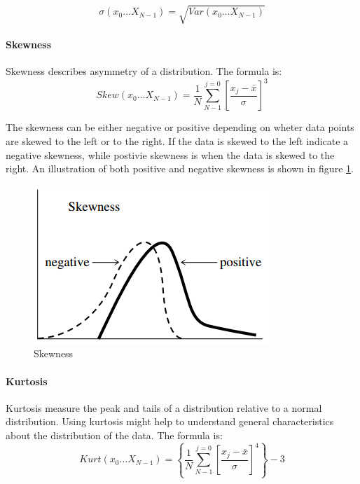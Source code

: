 \documentclass[USenglish]{ifimaster}  %
\begin{document}
\begin{equation}
  \sigma(x_0\dotsc X_{N-1})  = \sqrt{Var(x_0\dotsc X_{N-1})}
    \label{eq:std}
\end{equation}

\paragraph{Skewness} 
Skewness describes asymmetry of a distribution. The formula is:
\begin{equation}
  Skew(x_0\dotsc X_{N-1})  =  \frac{1}{N}\sum_{N-1}^{j=0}\left [ \frac{x_j-\bar{x}}{\sigma} \right ]^3
    \label{eq:skew}
\end{equation}

The skewness can be either negative or positive depending on wheter data points are skewed to the left or to the right. If the data is skewed to the left indicate a negative skewness, while postivie skewness is when the data is skewed to the right. An illustration of both positive and negative skewness is shown in figure \ref{fig:skew}.

\begin{figure}[h]
    \centering
    \includegraphics[scale=0.8]{Figures/Skewness}
    \caption{Skewness}
    \label{fig:skew}
\end{figure}

\FloatBarrier

\paragraph{Kurtosis}
Kurtosis measure the peak and tails of a distribution relative to a normal distribution. Using kurtosis might help to understand general characteristics about the distribution of the data. The formula is:
\begin{equation}
  Kurt(x_0\dotsc X_{N-1}) = \left \{ \frac{1}{N}\sum_{N-1}^{j=0}\left [ \frac{x_j-\bar{x}}{\sigma} \right ]^4 \right \}-3
    \label{eq:kurtosis}
\end{equation}
\end{document}
